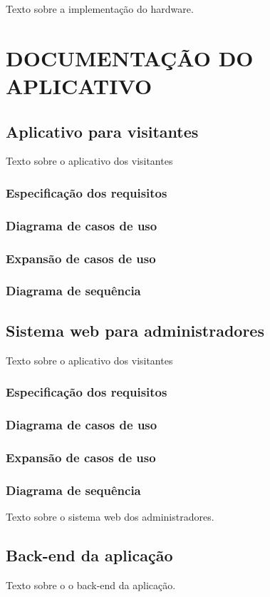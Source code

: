 Texto sobre a implementação do hardware.

\section{DOCUMENTAÇÃO DO APLICATIVO}


\subsection{Aplicativo para visitantes}

Texto sobre o aplicativo dos visitantes

\subsubsection{Especificação dos requisitos}
\subsubsection{Diagrama de casos de uso}
\subsubsection{Expansão de casos de uso}
\subsubsection{Diagrama de sequência}

\subsection{Sistema web para administradores}

Texto sobre o aplicativo dos visitantes

\subsubsection{Especificação dos requisitos}
\subsubsection{Diagrama de casos de uso}
\subsubsection{Expansão de casos de uso}
\subsubsection{Diagrama de sequência}

Texto sobre o sistema web dos administradores.

\subsection{Back-end da aplicação}

Texto sobre o o back-end da aplicação.